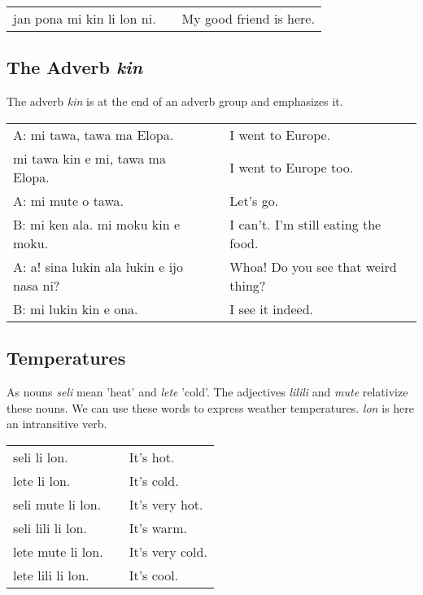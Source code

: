 \begin{supertabular}{p{5,5cm}|ll}
    jan pona mi kin li lon ni. &  & My good friend is here. \\
\end{supertabular}

\subsection*{The Adverb \textit{kin}}
%
%

The adverb \textit{kin} is at the end of an adverb group and emphasizes it.

\begin{supertabular}{p{5,5cm}|ll}
    A: mi tawa, tawa ma Elopa.                &  & I went to Europe.                   \\
    mi tawa kin e mi, tawa ma Elopa.          &  & I went to Europe too.               \\
    A: mi mute o tawa.                        &  & Let's go.                           \\
    B: mi ken ala. mi moku kin e moku.        &  & I can't. I'm still eating the food. \\
    A: a! sina lukin ala lukin e ijo nasa ni? &  & Whoa! Do you see that weird thing?  \\
    B: mi lukin kin e ona.                    &  & I see it indeed.                    \\
\end{supertabular}

%
%
%
%
\subsection*{Temperatures}
%
%
As nouns \textit{seli} mean 'heat' and \textit{lete} 'cold'.
The adjectives \textit{lilili} and \textit{mute} relativize these nouns.
We can use these words to express weather temperatures.
\textit{lon} is here an intransitive verb.

\begin{supertabular}{p{5,5cm}|ll}
    seli li lon.      &  & It's hot.       \\
    lete li lon.      &  & It's cold.      \\
    seli mute li lon. &  & It's very hot.  \\
    seli lili li lon. &  & It's warm.      \\
    lete mute li lon. &  & It's very cold. \\
    lete lili li lon. &  & It's cool.      \\
\end{supertabular}

